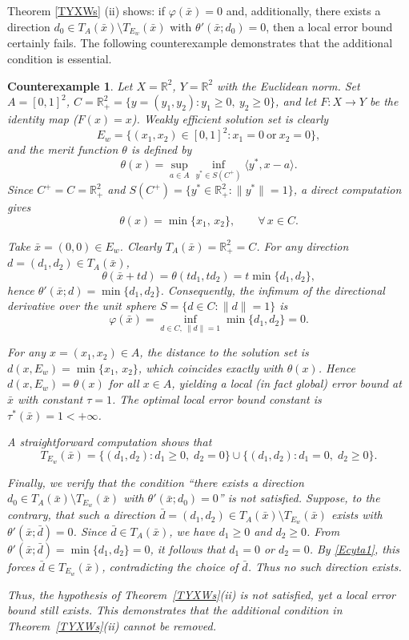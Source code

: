 \documentclass[11pt]{article}
\newtheorem{counterexample}{Counterexample}[section]
\begin{document}
  
 
  
 
Theorem  \ref{TYXWs} (ii) shows: if $	\varphi(\bar{x})=0$ and, additionally, there exists a direction $d_0\in T_A(\bar{x})\setminus T_{E_w}(\bar{x})$ with $\theta'(\bar{x};d_0)=0$, then a local error bound certainly fails.   The following counterexample demonstrates that the additional condition is essential.
 
  
 
 \begin{counterexample}   
 	Let $X=\mathbb{R}^2$, $Y=\mathbb{R}^2$ with the Euclidean norm.  
 	Set $A=[0,1]^2$, $C=\mathbb{R}^2_+=\{y=(y_1,y_2):y_1\ge0,\ y_2\ge0\}$, and let $F:X\to Y$ be the identity map ($F(x)=x$).  
  Weakly efficient solution set is clearly
 	\[
 	E_w = \{(x_1,x_2)\in[0,1]^2 : x_1=0\ \text{or}\ x_2=0\},
 	\]
 	and the merit function $\theta$ is defined by
 	\[
 	\theta(x) = \sup_{a\in A} \inf_{y^*\in S(C^+)} \langle y^*, x - a\rangle .
 	\]
 	Since $C^+ = C = \mathbb{R}^2_+$ and $S(C^+) = \{y^*\in\mathbb{R}^2_+ : \|y^*\|=1\}$, a direct computation gives
 	\[
 	\theta(x) = \min\{x_1,\,x_2\}, \qquad \forall\, x\in C .
 	\]
 	
 	Take $\bar{x}=(0,0)\in E_w$.  Clearly $T_A(\bar{x}) = \mathbb{R}^2_+ = C$.  
 	For any direction $d=(d_1,d_2)\in T_A(\bar{x})$,
 	\[
 	\theta(\bar{x}+td) = \theta(td_1,td_2) = t\min\{d_1,d_2\},
 	\]
 	hence $\theta'(\bar{x};d) = \min\{d_1,d_2\}$.  
 	Consequently, the infimum of the directional derivative over the unit sphere $S = \{d\in C : \|d\|=1\}$ is
 	\[
 	\varphi(\bar{x}) = \inf_{d\in C,\ \|d\|=1} \min\{d_1,d_2\} = 0 .
 	\]
 	
 	For any $x=(x_1,x_2)\in A$, the distance to the solution set is $d(x,E_w) = \min\{x_1,\,x_2\}$, which coincides exactly with $\theta(x)$.  
 	Hence $d(x,E_w) = \theta(x)$ for all $x\in A$, yielding a local (in fact global) error bound at $\bar{x}$ with constant $\tau=1$.  
 	The optimal local error bound constant is $\tau^*(\bar{x}) = 1 < +\infty$.
 	
 	A straightforward computation shows that
 	\begin{equation}\label{Ecyta1}
 		T_{E_w}(\bar{x}) = \{(d_1,d_2): d_1\ge0,\; d_2=0\} \cup \{(d_1,d_2): d_1=0,\; d_2\ge0\}.
 	\end{equation}
 	
 	Finally, we verify that the condition ``there exists a direction $d_0\in T_A(\bar{x})\setminus T_{E_w}(\bar{x})$ with $\theta'(\bar{x};d_0)=0$'' is not satisfied.  
 	Suppose, to the contrary, that such a direction $\bar{d}=(d_1,d_2)\in T_A(\bar{x})\setminus T_{E_w}(\bar{x})$ exists with $\theta'(\bar{x};\bar{d})=0$.  
 	Since $\bar{d}\in T_A(\bar{x})$, we have $d_1\ge0$ and $d_2\ge0$.  From $\theta'(\bar{x};\bar{d}) = \min\{d_1,d_2\}=0$, it follows that $d_1=0$ or $d_2=0$.  By \eqref{Ecyta1}, this forces $\bar{d}\in T_{E_w}(\bar{x})$, contradicting the choice of $\bar{d}$.  
 	Thus no such direction exists.
 	
Thus, the hypothesis of Theorem~\ref{TYXWs}(ii) is not satisfied, yet a local error bound still exists. This demonstrates that the additional condition in Theorem~\ref{TYXWs}(ii) cannot be removed.
 \end{counterexample}
 
\end{document}
